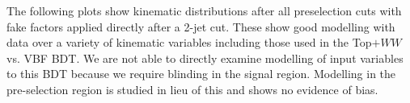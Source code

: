 The following plots show kinematic distributions after all preselection cuts with fake factors applied directly after a 2-jet cut. These show good modelling with data over a variety of kinematic variables including those used in the Top$+WW$ vs. VBF BDT. We are not able to directly examine modelling of input variables to this BDT because we require blinding in the signal region. Modelling in the pre-selection region is studied in lieu of this and shows no evidence of bias.

\begin{figure}[!h]
  \hfill
  \hfill
  \hfill
  \hfill
\end{figure}
